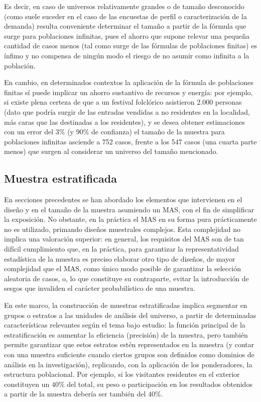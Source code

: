 \documentclass[
]{book}
\begin{document}
Es decir, en caso de universos relativamente grandes o de tamaño desconocido (como suele suceder en el caso de las encuestas de perfil o caracterización de la demanda) resulta conveniente determinar el tamaño a partir de la fórmula que surge para poblaciones infinitas, pues el ahorro que supone relevar una pequeña cantidad de casos menos (tal como surge de las fórmulas de poblaciones finitas) es ínfimo y no compensa de ningún modo el riesgo de no asumir como infinita a la población.

En cambio, en determinados contextos la aplicación de la fórmula de poblaciones finitas sí puede implicar un ahorro sustantivo de recursos y energía: por ejemplo, si existe plena certeza de que a un festival folclórico asistieron 2.000 personas (dato que podría surgir de las entradas vendidas a no residentes en la localidad, más caras que las destinadas a los residentes), y se desea obtener estimaciones con un error del \(3\%\) (y \(90\%\) de confianza) el tamaño de la muestra para poblaciones infinitas asciende a 752 casos, frente a los 547 casos (una cuarta parte menos) que surgen al considerar un universo del tamaño mencionado.

\hypertarget{muestra-estratificada}{%
\subsection{Muestra estratificada}\label{muestra-estratificada}}

En secciones precedentes se han abordado los elementos que intervienen en el diseño y en el tamaño de la muestra asumiendo un MAS, con el fin de simplificar la exposición. No obstante, en la práctica el MAS en su forma pura prácticamente no es utilizado, primando diseños muestrales complejos. Esta complejidad no implica una valoración superior: en general, los requisitos del MAS son de tan difícil cumplimiento que, en la práctica, para garantizar la representatividad estadística de la muestra es preciso elaborar otro tipo de diseños, de mayor complejidad que el MAS, como único modo posible de garantizar la selección aleatoria de casos, o, lo que constituye su contraparte, evitar la introducción de sesgos que invaliden el carácter probabilístico de una muestra.

En este marco, la construcción de muestras estratificadas implica segmentar en grupos o estratos a las unidades de análisis del universo, a partir de determinadas características relevantes según el tema bajo estudio: la función principal de la estratificación es aumentar la eficiencia (precisión) de la muestra, pero también permite garantizar que estos estratos estén representados en la muestra (y contar con una muestra suficiente cuando ciertos grupos son definidos como dominios de análisis en la investigación), replicando, con la aplicación de los ponderadores, la estructura poblacional. Por ejemplo, si los visitantes residentes en el exterior constituyen un \(40\%\) del total, su peso o participación en los resultados obtenidos a partir de la muestra debería ser también del \(40\%\).
\end{document}
